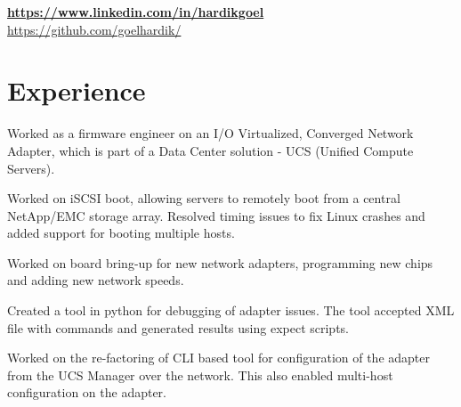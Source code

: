 \documentclass[]{deedy-resume-openfont}
\begin{document}
%
%
\lastupdated

%
%


\vspace{\topsep}
{\selectfont\bfseries\href{https://www.linkedin.com/in/hardikgoel}{https://www.linkedin.com/in/hardikgoel}}\\
\vspace{\topsep}
{\selectfont\href{https://github.com/goelhardik/}{https://github.com/goelhardik/}}\\


%
%

\section{Experience}

\vspace{\topsep} %
\begin{tightemize}
\item Worked as a firmware engineer on an I/O Virtualized, Converged Network Adapter, which is part of a Data Center solution - UCS (Unified Compute Servers).
\item Worked on iSCSI boot, allowing servers to remotely boot from a central NetApp/EMC
storage array. Resolved timing issues to fix Linux crashes and added support for booting multiple hosts.
\item Worked on board bring-up for new network adapters, programming new chips and adding new network speeds.
\item Created a tool in python for debugging of adapter issues. The tool accepted XML file with commands and generated results using expect scripts.
\item Worked on the re-factoring of CLI based tool for configuration of the adapter from the UCS Manager over the network. This also enabled multi-host configuration on the adapter.
\end{tightemize}
\sectionsep
\end{document}
